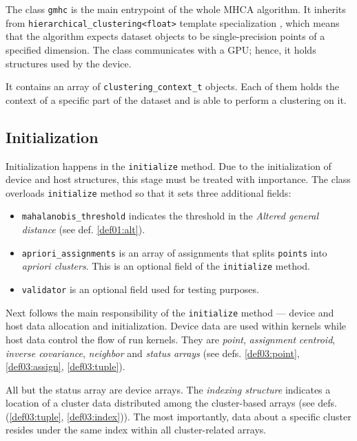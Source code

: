 The class \texttt{gmhc} is the main entrypoint of the whole MHCA algorithm. It inherits from \texttt{hierarchical\_clustering<float>} template specialization                            , which means that the algorithm expects dataset objects to be single-precision points of a specified dimension. The class communicates
with a GPU; hence, it holds structures used by the device.

It contains an array of \texttt{clustering\_context\_t} objects. Each of them holds the context of a specific part of the dataset and is able to perform a clustering on it.

\subsection{Initialization}

Initialization happens in the \texttt{initialize} method. Due to the initialization of device and host structures, this stage must be treated with importance.
The class overloads \texttt{initialize} method so that it sets three additional fields:
\begin{itemize}
	\item \texttt{mahalanobis\_threshold} indicates the threshold in the \emph{Altered general distance} (see def. \ref{def01:alt}).
	
	\item\texttt{apriori\_assignments}  is an array of assignments that splits \texttt{points} into \emph{apriori clusters}. This is an optional field of the \texttt{initialize} method.
	
	\item \texttt{validator} is an optional field used for testing purposes.
\end{itemize}

Next follows the main responsibility of the \texttt{initialize} method --- device and host data allocation and initialization. Device data are used within kernels while host data control the flow of run kernels. They are \emph{point}, \emph{assignment} \emph{centroid}, \emph{inverse covariance}, \emph{neighbor} and \emph{status arrays} (see defs. \ref{def03:point}, \ref{def03:assign}, \ref{def03:tuple}). 

All but the status array are device arrays. The \emph{indexing structure} indicates a location of a cluster data distributed among the cluster-based arrays (see defs. (\ref{def03:tuple}, \ref{def03:index})). The most importantly, data about a specific cluster resides under the same index within all cluster-related arrays.

